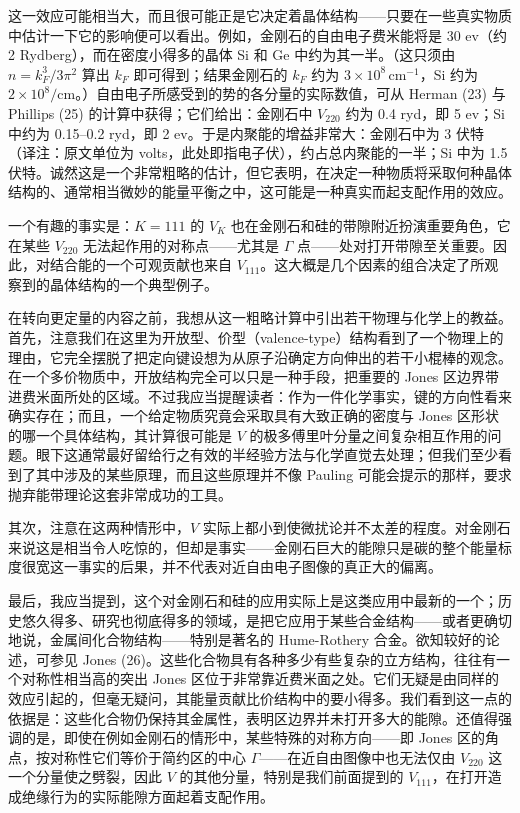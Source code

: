 这一效应可能相当大，而且很可能正是它决定着晶体结构——只要在一些真实物质中估计一下它的影响便可以看出。例如，金刚石的自由电子费米能将是 30 ev（约 2 Rydberg），而在密度小得多的晶体 Si 和 Ge 中约为其一半。（这只须由 $n=k_F^3/3\pi^2$ 算出 $k_F$ 即可得到；结果金刚石的 $k_F$ 约为 $3\times 10^{8}\,\mathrm{cm}^{-1}$，Si 约为 $2\times 10^{8}/\mathrm{cm}$。）自由电子所感受到的势的各分量的实际数值，可从 Herman (23) 与 Phillips (25) 的计算中获得；它们给出：金刚石中 $V_{220}$ 约为 0.4 ryd，即 5 ev；Si 中约为 0.15--0.2 ryd，即 2 ev。于是内聚能的增益非常大：金刚石中为 3 伏特（译注：原文单位为 volts，此处即指电子伏），约占总内聚能的一半；Si 中为 1.5 伏特。诚然这是一个非常粗略的估计，但它表明，在决定一种物质将采取何种晶体结构的、通常相当微妙的能量平衡之中，这可能是一种真实而起支配作用的效应。

一个有趣的事实是：$K=111$ 的 $V_K$ 也在金刚石和硅的带隙附近扮演重要角色，它在某些 $V_{220}$ 无法起作用的对称点——尤其是 $\Gamma$ 点——处对打开带隙至关重要。因此，对结合能的一个可观贡献也来自 $V_{111}$。这大概是几个因素的组合决定了所观察到的晶体结构的一个典型例子。

在转向更定量的内容之前，我想从这一粗略计算中引出若干物理与化学上的教益。首先，注意我们在这里为开放型、价型（valence-type）结构看到了一个物理上的理由，它完全摆脱了把定向键设想为从原子沿确定方向伸出的若干小棍棒的观念。在一个多价物质中，开放结构完全可以只是一种手段，把重要的 Jones 区边界带进费米面所处的区域。不过我应当提醒读者：作为一件化学事实，键的方向性看来确实存在；而且，一个给定物质究竟会采取具有大致正确的密度与 Jones 区形状的哪一个具体结构，其计算很可能是 $V$ 的极多傅里叶分量之间复杂相互作用的问题。眼下这通常最好留给行之有效的半经验方法与化学直觉去处理；但我们至少看到了其中涉及的某些原理，而且这些原理并不像 Pauling 可能会提示的那样，要求抛弃能带理论这套非常成功的工具。

其次，注意在这两种情形中，$V$ 实际上都小到使微扰论并不太差的程度。对金刚石来说这是相当令人吃惊的，但却是事实——金刚石巨大的能隙只是碳的整个能量标度很宽这一事实的后果，并不代表对近自由电子图像的真正大的偏离。

最后，我应当提到，这个对金刚石和硅的应用实际上是这类应用中最新的一个；历史悠久得多、研究也彻底得多的领域，是把它应用于某些合金结构——或者更确切地说，金属间化合物结构——特别是著名的 Hume-Rothery 合金。欲知较好的论述，可参见 Jones (26)。这些化合物具有各种多少有些复杂的立方结构，往往有一个对称性相当高的突出 Jones 区位于非常靠近费米面之处。它们无疑是由同样的效应引起的，但毫无疑问，其能量贡献比价结构中的要小得多。我们看到这一点的依据是：这些化合物仍保持其金属性，表明区边界并未打开多大的能隙。还值得强调的是，即使在例如金刚石的情形中，某些特殊的对称方向——即 Jones 区的角点，按对称性它们等价于简约区的中心 $\Gamma$——在近自由图像中也无法仅由 $V_{220}$ 这一个分量使之劈裂，因此 $V$ 的其他分量，特别是我们前面提到的 $V_{111}$，在打开造成绝缘行为的实际能隙方面起着支配作用。

